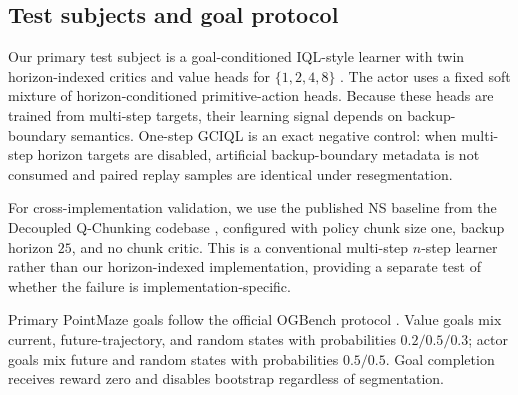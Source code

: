 \subsection{Test subjects and goal protocol}

Our primary test subject is a goal-conditioned IQL-style learner with twin horizon-indexed critics and value heads for $\{1,2,4,8\}$ \cite{kostrikov2022iql}. The actor uses a fixed soft mixture of horizon-conditioned primitive-action heads. Because these heads are trained from multi-step targets, their learning signal depends on backup-boundary semantics. One-step GCIQL is an exact negative control: when multi-step horizon targets are disabled, artificial backup-boundary metadata is not consumed and paired replay samples are identical under resegmentation.

For cross-implementation validation, we use the published NS baseline from the Decoupled Q-Chunking codebase \cite{li2026dqc}, configured with policy chunk size one, backup horizon $25$, and no chunk critic. This is a conventional multi-step $n$-step learner rather than our horizon-indexed implementation, providing a separate test of whether the failure is implementation-specific.

Primary PointMaze goals follow the official OGBench protocol \cite{ogbench2024}. Value goals mix current, future-trajectory, and random states with probabilities $0.2/0.5/0.3$; actor goals mix future and random states with probabilities $0.5/0.5$. Goal completion receives reward zero and disables bootstrap regardless of segmentation.
